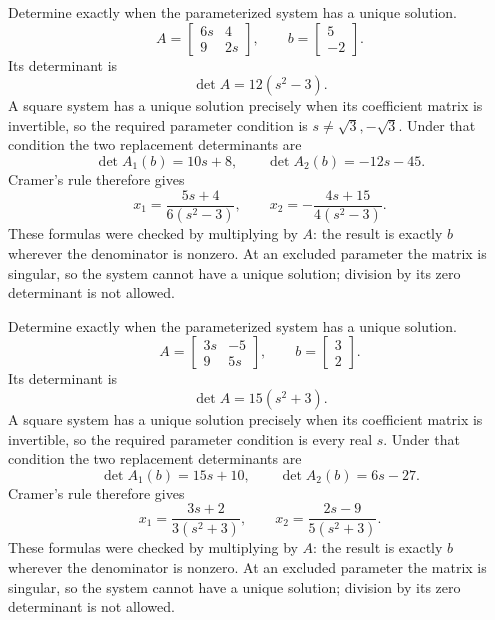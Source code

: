 \goal Determine exactly when the parameterized system has a unique solution.
\[A=\begin{bmatrix}6 s&4\\9&2 s\end{bmatrix},\qquad b=\begin{bmatrix}5\\-2\end{bmatrix}.\]
Its determinant is
\[\det A=12 \left(s^{2} - 3\right).\]
A square system has a unique solution precisely when its coefficient matrix is invertible, so the required parameter condition is $s\ne\sqrt3,-\sqrt3$. Under that condition the two replacement determinants are
\[\det A_1(b)=10 s + 8,\qquad\det A_2(b)=- 12 s - 45.\]
Cramer's rule therefore gives
\[x_1=\frac{5 s + 4}{6 \left(s^{2} - 3\right)},\qquad x_2=- \frac{4 s + 15}{4 \left(s^{2} - 3\right)}.\]
These formulas were checked by multiplying by $A$: the result is exactly $b$ wherever the denominator is nonzero. At an excluded parameter the matrix is singular, so the system cannot have a unique solution; division by its zero determinant is not allowed.

\goal Determine exactly when the parameterized system has a unique solution.
\[A=\begin{bmatrix}3 s&-5\\9&5 s\end{bmatrix},\qquad b=\begin{bmatrix}3\\2\end{bmatrix}.\]
Its determinant is
\[\det A=15 \left(s^{2} + 3\right).\]
A square system has a unique solution precisely when its coefficient matrix is invertible, so the required parameter condition is every real $s$. Under that condition the two replacement determinants are
\[\det A_1(b)=15 s + 10,\qquad\det A_2(b)=6 s - 27.\]
Cramer's rule therefore gives
\[x_1=\frac{3 s + 2}{3 \left(s^{2} + 3\right)},\qquad x_2=\frac{2 s - 9}{5 \left(s^{2} + 3\right)}.\]
These formulas were checked by multiplying by $A$: the result is exactly $b$ wherever the denominator is nonzero. At an excluded parameter the matrix is singular, so the system cannot have a unique solution; division by its zero determinant is not allowed.

